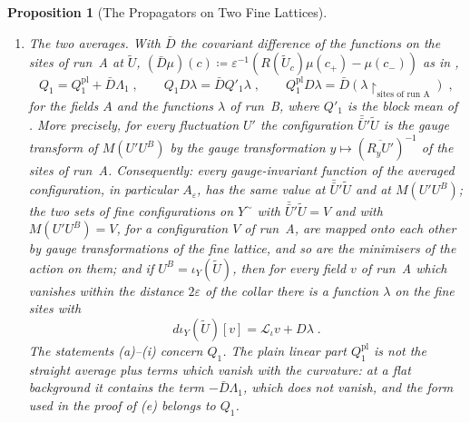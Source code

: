 \documentclass[11pt]{preprint}
\numberwithin{equation}{section}
\newtheorem{proposition}{Proposition}
\theoremstyle{definition}
\theoremstyle{remark}
\theoremstyle{plain}
\begin{document}
\begin{proposition}[The Propagators on Two Fine Lattices]
\begin{enumerate}[label=(\alph*)]
\begin{equation}
\end{equation}
the sums over the blocks $z'$ of side $\varepsilon$, with constants $C_{\mathrm{rc}}$ and $C_{\mathrm{rc}}(\beta)$ of $d$, $L$, $\beta$, and the constants of \cite[Theorems~3.1, 3.2, 3.12]{BalabanPBG}.
\item \emph{The two averages.} With $\bar D$ the covariant difference of the functions on the sites of run~A at $\tilde U$, $(\bar D\mu)(c) \coloneqq \varepsilon^{-1}(R(\tilde U_c)\mu(c_+) - \mu(c_-))$ as in \cite[(3.114)]{BalabanPBG},
\begin{equation}\label{eq:plain-dressed}
    Q_1 = Q^{\mathrm{pl}}_1 + \bar D\Lambda_1\;,
    \qquad
    Q_1D\lambda = \bar DQ'_1\lambda\;,
    \qquad
    Q^{\mathrm{pl}}_1D\lambda = \bar D(\lambda\restriction_{\text{sites of run~A}})\;,
\end{equation}
for the fields $A$ and the functions $\lambda$ of run~B, where $Q'_1$ is the block mean of \cite[(3.19)]{BalabanPBG}. More precisely, for every fluctuation $U'$ the configuration $\bar{\bar U}'\tilde U$ is the gauge transform of $M(U'U^B)$ by the gauge transformation $y \mapsto (\overline{R_yU'})^{-1}$ of the sites of run~A. Consequently: every gauge-invariant function of the averaged configuration, in particular $A_\varepsilon$, has the same value at $\bar{\bar U}'\tilde U$ and at $M(U'U^B)$; the two sets of fine configurations on $Y^\sim$ with $\bar{\bar U}'\tilde U = V$ and with $M(U'U^B) = V$, for a configuration $V$ of run~A, are mapped onto each other by gauge transformations of the fine lattice, and so are the minimisers of the action on them; and if $U^B = \iota_Y(\tilde U)$, then for every field $v$ of run~A which vanishes within the distance $2\varepsilon$ of the collar there is a function $\lambda$ on the fine sites with
\begin{equation}\label{eq:lift-derivative}
    d\iota_Y(\tilde U)[v] = \mathcal L_\iota v + D\lambda\;.
\end{equation}
The statements (a)--(i) concern $Q_1$. The plain linear part $Q^{\mathrm{pl}}_1$ is not the straight average plus terms which vanish with the curvature: at a flat background it contains the term $-\bar D\Lambda_1$, which does not vanish, and the form \cite[(124), (125)]{BalabanAVG} used in the proof of (e) belongs to $Q_1$.
\end{enumerate}
\end{proposition}
\end{document}
